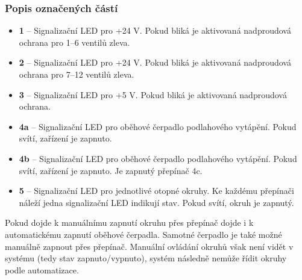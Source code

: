 \begin{Czech}
\subsubsection{Popis označených částí}
\end{Czech}

\begin{Czech}
\begin{itemize}
  \item \textbf{1} – Signalizační LED pro +24 V. Pokud bliká je aktivovaná nadproudová ochrana pro 1–6 ventilů zleva.
   \item \textbf{2} – Signalizační LED pro +24 V. Pokud bliká je aktivovaná nadproudová ochrana pro 7–12 ventilů zleva.  
   \item \textbf{3} – Signalizační LED pro +5 V. Pokud bliká je aktivovaná nadproudová ochrana.
    \item \textbf{4a} – Signalizační LED pro oběhové čerpadlo podlahového vytápění. Pokud svítí, zařízení je zapnuto.
    \item \textbf{4b} – Signalizační LED pro oběhové čerpadlo podlahového vytápění. Pokud svítí, zařízení je zapnuto. Je zapnutý přepínač 4c.  
     \item \textbf{5} – Signalizační LED pro jednotlivé otopné okruhy. Ke každému přepínači náleží jedna signalizační LED indikují stav. Pokud svítí, okruh je zapnutý.
\end{itemize}
\end{Czech}

\begin{Czech}
Pokud dojde k manuálnímu zapnutí okruhu přes přepínač dojde i k automatickému zapnutí oběhové čerpadla. Samotné čerpadlo je také možné manuálně zapnout přes přepínač. Manuální ovládání okruhů však není vidět v systému (tedy stav zapnuto/vypnuto), systém následně nemůže řídit okruhy podle automatizace.  
\end{Czech}


